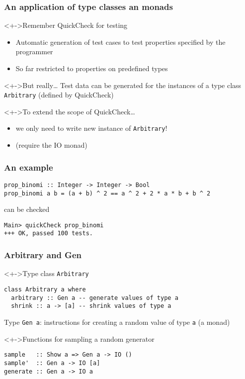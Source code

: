 \documentclass{beamer}
\subtitle{Test data generators}
\begin{document}
\begin{frame}
  \titlepage
\end{frame}
\begin{frame}[fragile]
  \frametitle{An application of type classes an monads}
  \begin{block}<+->{Remember QuickCheck for testing}
    \begin{itemize}
    \item Automatic generation of test cases to test properties specified by the programmer
    \item So far restricted to properties on predefined types
    \end{itemize}
  \end{block}
  \begin{block}<+->{But really\dots}
    Test data can be generated for the instances of a type class \texttt{Arbitrary} (defined by QuickCheck) 
  \end{block}
  \begin{block}<+->{To extend the scope of QuickCheck\dots}
    \begin{itemize}
    \item we only need to write new instance of \texttt{Arbitrary}!
    \item (require the IO monad)
    \end{itemize}
  \end{block}
\end{frame}
\begin{frame}[fragile]
  \frametitle{An example}
\begin{verbatim}
prop_binomi :: Integer -> Integer -> Bool
prop_binomi a b = (a + b) ^ 2 == a ^ 2 + 2 * a * b + b ^ 2
\end{verbatim}
  can be checked
\begin{verbatim}
Main> quickCheck prop_binomi
+++ OK, passed 100 tests.
\end{verbatim}
\end{frame}
\begin{frame}[fragile]
  \frametitle{Arbitrary and Gen}
  \begin{block}<+->{Type class \texttt{Arbitrary}}
\begin{verbatim}
class Arbitrary a where
  arbitrary :: Gen a -- generate values of type a
  shrink :: a -> [a] -- shrink values of type a
\end{verbatim}
    Type \texttt{Gen a}: instructions for creating a random value of type \texttt{a} (a monad)
  \end{block}
  \begin{block}<+->{Functions for sampling a random generator}
\begin{verbatim}
sample   :: Show a => Gen a -> IO ()
sample'  :: Gen a -> IO [a]
generate :: Gen a -> IO a
\end{verbatim}
  \end{block}
\end{frame}
\end{document}
